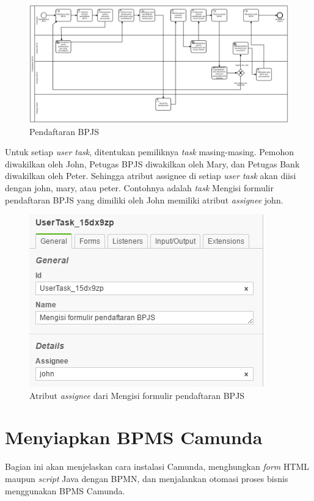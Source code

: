 		
		\begin{figure}[H]
			\centering
			\includegraphics[scale=0.4 ,angle=90]{Gambar/Bab-3/Kasus2-4}
			\caption{Pendaftaran BPJS} 
			\label{fig:workflow_pendaftaranbpjs}
	\end{figure}

Untuk setiap \textit{user task}, ditentukan pemiliknya \textit{task} masing-masing. Pemohon diwakilkan oleh John, Petugas BPJS diwakilkan oleh Mary, dan Petugas Bank diwakilkan oleh Peter. Sehingga atribut assignee di setiap \textit{user task} akan diisi dengan john, mary, atau peter. Contohnya adalah \textit{task} Mengisi formulir pendaftaran BPJS yang dimiliki oleh John memiliki atribut \textit{assignee} john. 

	\begin{figure}[H]
			\centering
			\includegraphics[scale=1]{Gambar/Bab-3/Kasus2/1assigneejohn}
			\caption{Atribut \textit{assignee} dari Mengisi formulir pendaftaran BPJS} 
			\label{fig:pendaftaranbpjs_assigneejohn}
	\end{figure}


\section{Menyiapkan BPMS Camunda}
\label{hasilstudi_menyiapkanbpms}
Bagian ini akan menjelaskan cara instalasi Camunda, menghungkan \textit{form} HTML maupun \textit{script} Java dengan BPMN, dan menjalankan otomasi proses bisnis menggunakan BPMS Camunda.
